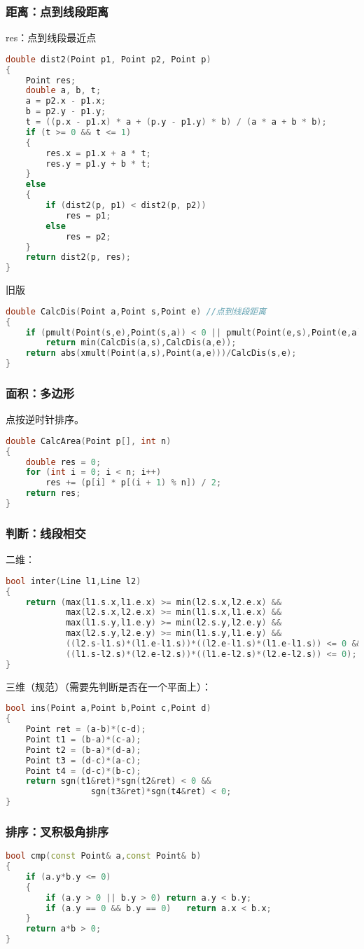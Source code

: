 	\subsubsection{距离：点到线段距离}
		res：点到线段最近点
		\begin{lstlisting}[language=c++]
double dist2(Point p1, Point p2, Point p)
{
	Point res;
	double a, b, t;
	a = p2.x - p1.x;
	b = p2.y - p1.y;
	t = ((p.x - p1.x) * a + (p.y - p1.y) * b) / (a * a + b * b);
	if (t >= 0 && t <= 1)
	{
		res.x = p1.x + a * t;
		res.y = p1.y + b * t;
	}
	else
	{
		if (dist2(p, p1) < dist2(p, p2))
			res = p1;
		else
			res = p2;
	}
	return dist2(p, res);
}
		\end{lstlisting}
		旧版
		\begin{lstlisting}[language=c++]
double CalcDis(Point a,Point s,Point e) //点到线段距离
{
	if (pmult(Point(s,e),Point(s,a)) < 0 || pmult(Point(e,s),Point(e,a)) < 0)
		return min(CalcDis(a,s),CalcDis(a,e));
	return abs(xmult(Point(a,s),Point(a,e)))/CalcDis(s,e);
}
		\end{lstlisting}
		
	\subsubsection{面积：多边形}
		点按逆时针排序。
		\begin{lstlisting}[language=c++]
double CalcArea(Point p[], int n)
{
	double res = 0;
	for (int i = 0; i < n; i++)
		res += (p[i] * p[(i + 1) % n]) / 2;
	return res;
}
		\end{lstlisting}
	
	\subsubsection{判断：线段相交}
	二维：
		\begin{lstlisting}[language=c++]
bool inter(Line l1,Line l2)
{
	return (max(l1.s.x,l1.e.x) >= min(l2.s.x,l2.e.x) &&
			max(l2.s.x,l2.e.x) >= min(l1.s.x,l1.e.x) &&
			max(l1.s.y,l1.e.y) >= min(l2.s.y,l2.e.y) &&
			max(l2.s.y,l2.e.y) >= min(l1.s.y,l1.e.y) &&
			((l2.s-l1.s)*(l1.e-l1.s))*((l2.e-l1.s)*(l1.e-l1.s)) <= 0 &&
			((l1.s-l2.s)*(l2.e-l2.s))*((l1.e-l2.s)*(l2.e-l2.s)) <= 0);
}
		\end{lstlisting}
	三维（规范）（需要先判断是否在一个平面上）：
	\begin{lstlisting}[language=c++]
bool ins(Point a,Point b,Point c,Point d)
{
	Point ret = (a-b)*(c-d);
	Point t1 = (b-a)*(c-a);
	Point t2 = (b-a)*(d-a);
	Point t3 = (d-c)*(a-c);
	Point t4 = (d-c)*(b-c);
	return sgn(t1&ret)*sgn(t2&ret) < 0 &&
				 sgn(t3&ret)*sgn(t4&ret) < 0;
}
	\end{lstlisting}
	
	\subsubsection{排序：叉积极角排序}
	\begin{lstlisting}[language=c++]
bool cmp(const Point& a,const Point& b)
{
	if (a.y*b.y <= 0)
	{
		if (a.y > 0 || b.y > 0)	return a.y < b.y;
		if (a.y == 0 && b.y == 0)	return a.x < b.x;
	}
	return a*b > 0;
}
	\end{lstlisting}